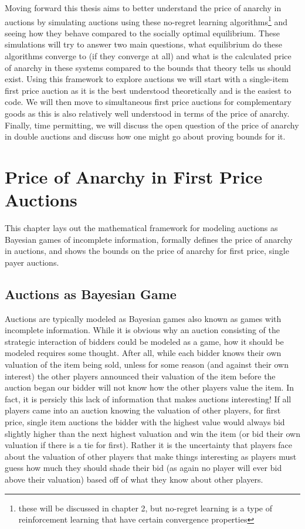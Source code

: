 \documentclass[12pt,twoside]{reedthesis}
\begin{document}
Moving forward this thesis aims to better understand the price of anarchy in auctions by simulating auctions using these no-regret learning algorithms\footnote{these will be discussed in chapter 2, but no-regret learning is a type of reinforcement learning that have certain convergence properties} and seeing how they behave compared to the socially optimal equilibrium. These simulations will try to answer two main questions, what equilibrium do these algorithms converge to (if they converge at all) and what is the calculated price of anarchy in these systems compared to the bounds that theory tells us should exist. Using this framework to explore auctions we will start with a single-item first price auction as it is the best understood theoretically and is the easiest to code. We will then move to simultaneous first price auctions for complementary goods as this is also relatively well understood in terms of the price of anarchy. Finally, time permitting, we will discuss the open question of the price of anarchy in double auctions and discuss how one might go about proving bounds for it.

\chapter{Price of Anarchy in First Price Auctions}
This chapter lays out the mathematical framework for modeling auctions as Bayesian games of incomplete information, formally defines the price of anarchy in auctions, and shows the bounds on the price of anarchy for first price, single payer auctions.

\section{Auctions as Bayesian Game}
Auctions are typically modeled as Bayesian games also known as games with incomplete information. While it is obvious why an auction consisting of the strategic interaction of bidders could be modeled as a game, how it should be modeled requires some thought. After all, while each bidder knows their own valuation of the item being sold, unless for some reason (and against their own interest) the other players announced their valuation of the item before the auction began our bidder will not know how the other players value the item. In fact, it is persicly this lack of information that makes auctions interesting! If all players came into an auction knowing the valuation of other players, for first price, single item auctions the bidder with the highest value would always bid slightly higher than the next highest valuation and win the item (or bid their own valuation if there is a tie for first). Rather it is the uncertainty that players face about the valuation of other players that make things interesting as players must guess how much they should shade their bid (as again no player will ever bid above their valuation) based off of what they know about other players. 
\end{document}
